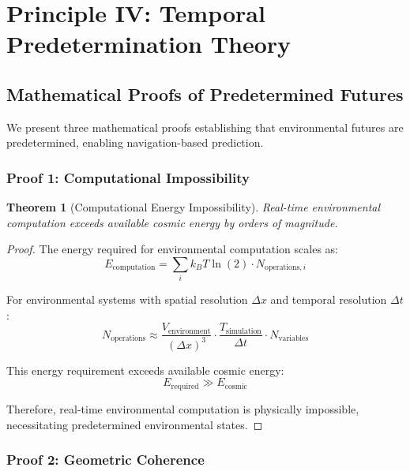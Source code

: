 \documentclass[12pt,a4paper]{article}
\newtheorem{theorem}{Theorem}
\begin{document}
\section{Principle IV: Temporal Predetermination Theory}

\subsection{Mathematical Proofs of Predetermined Futures}

We present three mathematical proofs establishing that environmental futures are predetermined, enabling navigation-based prediction.

\subsubsection{Proof 1: Computational Impossibility}

\begin{theorem}[Computational Energy Impossibility]
Real-time environmental computation exceeds available cosmic energy by orders of magnitude.
\end{theorem}

\begin{proof}
The energy required for environmental computation scales as:
\begin{equation}
E_{\text{computation}} = \sum_i k_B T \ln(2) \cdot N_{\text{operations},i}
\end{equation}

For environmental systems with spatial resolution $\Delta x$ and temporal resolution $\Delta t$:
\begin{equation}
N_{\text{operations}} \approx \frac{V_{\text{environment}}}{(\Delta x)^3} \cdot \frac{T_{\text{simulation}}}{\Delta t} \cdot N_{\text{variables}}
\end{equation}

This energy requirement exceeds available cosmic energy:
\begin{equation}
E_{\text{required}} \gg E_{\text{cosmic}}
\end{equation}

Therefore, real-time environmental computation is physically impossible, necessitating predetermined environmental states.
\end{proof}

\subsubsection{Proof 2: Geometric Coherence}
\end{document}
